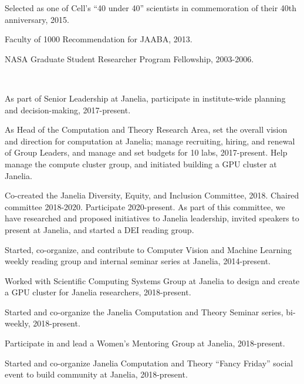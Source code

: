 \documentclass[11pt, letterpaper]{awesome-cv}
\begin{document}
\vspace{\acvSectionContentTopSkip}
\vspace{2mm}
\begin{cvitems}
\item Selected as one of Cell’s ``40 under 40'' scientists in commemoration of their 40th anniversary, 2015.
\item Faculty of 1000 Recommendation for JAABA, 2013.
\item NASA Graduate Student Researcher Program Fellowship, 2003-2006.
\end{cvitems}\\
\vspace{\acvSectionContentTopSkip}

\vspace{\acvSectionContentTopSkip}
\vspace{2mm}
\begin{cvitems}
\item As part of Senior Leadership at Janelia, participate in institute-wide planning and decision-making, 2017-present.
\item As Head of the Computation and Theory Research Area, set the overall vision and direction for computation at Janelia; manage recruiting, hiring, and renewal of Group Leaders, and manage and set budgets for 10 labs, 2017-present. Help manage the compute cluster group, and initiated building a GPU cluster at Janelia. 
\item Co-created the Janelia Diversity, Equity, and Inclusion Committee, 2018. Chaired committee 2018-2020. Participate 2020-present. As part of this committee, we have researched and proposed initiatives to Janelia leadership, invited speakers to present at Janelia, and started a DEI reading group.
\item Started, co-organize, and contribute to Computer Vision and Machine Learning weekly reading group and internal seminar series at Janelia, 2014-present.
\item Worked with Scientific Computing Systems Group at Janelia to design and create a GPU cluster for Janelia researchers, 2018-present.
\item Started and co-organize the Janelia Computation and Theory Seminar series, bi-weekly, 2018-present. 
\item Participate in and lead a Women's Mentoring Group at Janelia, 2018-present.
\item Started and co-organize Janelia Computation and Theory ``Fancy Friday'' social event to build community at Janelia, 2018-present. 
\end{cvitems}
\vspace{\acvSectionContentTopSkip}
\end{document}
